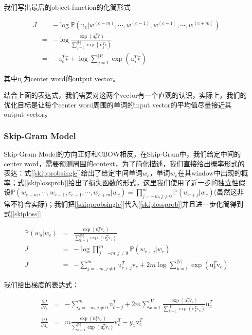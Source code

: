 \documentclass{article}
\begin{document}
我们写出最后的object function的化简形式

\begin{eqnarray}
J &=& -\log\mathbb{P}(\mathrm{u_c}\lvert w^{(c-m)},\cdots,w^{(c-1)},w^{(c+1)},\cdots,w^{(c+m)}) \\
  &=& -\log\frac{\exp(\mathrm{u}_c^T\hat{\mathrm{v}})}{\sum_{j=1}^{\lvert V\rvert}{\exp(\mathrm{u}_j^T\hat{\mathrm{v}})}} \\
  &=& -\mathrm{u}_c^T\hat{\mathrm{v}} + \log\sum_{j=1}^{\lvert V\rvert}{\exp(\mathrm{u}_j^T\hat{\mathrm{v}})}
\end{eqnarray}

其中$\mathrm{u}_c$为center word的output vector。

结合上面的表达式，我们需要对这两个vector有一个直观的认识，实际上，我们的优化目标是让每个center word周围的单词的input vector的平均值尽量接近其output vector。

\subsubsection*{Skip-Gram Model}

Skip-Gram Model的方向正好和CBOW相反，在Skip-Gram中，我们给定中间的center word，需要预测周围的context，为了简化描述，我们直接给出概率形式的表达：式[\ref{skipprobsingle}]给出了给定中间单词$w_c$，单词$w_o$在其window中出现的概率；式[\ref{skiplossprob}]给出了损失函数的形式，这里我们使用了近一步的独立性假设$\mathbb{P}(w_{c-m},\cdots,w_{c-1},c_{c+1},\cdots,w_{c+m}\lvert w_c)=\prod_{j=-m,j\neq 0}^{m} \mathbb{P}(w_{c+j}\lvert w_c)$(虽然这非常不符合实际)；我们把[\ref{skipprobsingle}]代入[\ref{skiplossprob}]并且进一步化简得到式[\ref{skiploss}]

\begin{eqnarray} \label{skipprobsingle}
\mathbb{P}(w_o\lvert w_c) &=& \frac{\exp(\mathrm{u}_o^T\mathrm{v}_c)}{\sum_{k=1}^{\lvert V\rvert}{\exp(\mathrm{u}_k^T\mathrm{v}_c)}} \\
\label{skiplossprob}
J &=& -\log\prod_{j=-m,j\neq 0}^{m} \mathbb{P}(w_{c+j}\lvert w_c) \\
\label{skiploss}
J &=& -\sum_{j=-m,j\neq 0}^{m}{\mathrm{u}_{c+j}^T\mathrm{v}_c}+2m\log\sum_{k=1}^{\lvert V\rvert}{\exp(\mathrm{u}_k^T\mathrm{v}_c)}
\end{eqnarray}

我们给出梯度的表达式：

\begin{eqnarray}
\frac{\partial J}{\partial \mathrm{v}_c}&=&-\sum_{j=-m,j\neq 0}^{m}{\mathrm{u}_{c+j}^T}+2m\sum_{x=1}^{\lvert V\rvert}{\frac{\exp(\mathrm{u}_x^T\mathrm{v}_c)}{\sum_{k=1}^{\lvert V\rvert}{\exp(\mathrm{u}_k^T\mathrm{v}_c)}}\mathrm{u}_x^T}\\
\frac{\partial J}{\partial \mathrm{u}_x}&=&m \frac{\exp(\mathrm{u}_x^T\mathrm{v}_c)}{\sum_{k=1}^{\lvert V\rvert}{\exp(\mathrm{u}_k^T\mathrm{v}_c)}}\mathrm{v}_c^T - y_x\mathrm{v}_c^T
\end{eqnarray}
\end{document}
